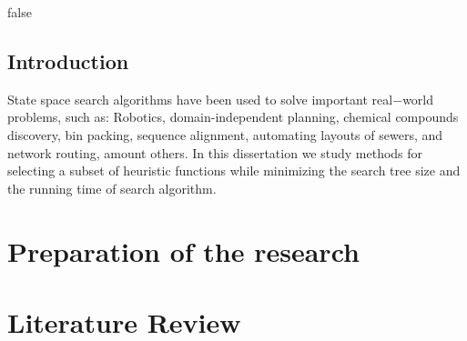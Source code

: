 \documentclass[
	12pt,				%
	openright,		nsubseteq	%
	twoside,			%
	a4paper,			%
	english,			%
	french,				%
	spanish,			%
	brazil				%
	]{abntex2}
\begin{document}
\tableofcontents*
\cleardoublepage



\textual

\if false
\chapter*[Introduction]{Introduction}

\noindent
State space search algorithms have been used to solve important real$-$world problems, such as: Robotics, domain-independent planning, chemical compounds discovery, bin packing, sequence alignment, automating layouts of sewers, and network routing, amount others. In this dissertation we study methods for selecting a subset of heuristic functions while minimizing the search tree size and the running time of search algorithm.

\fi
\part{Preparation of the research}


%

\part{Literature Review}

\end{document}
